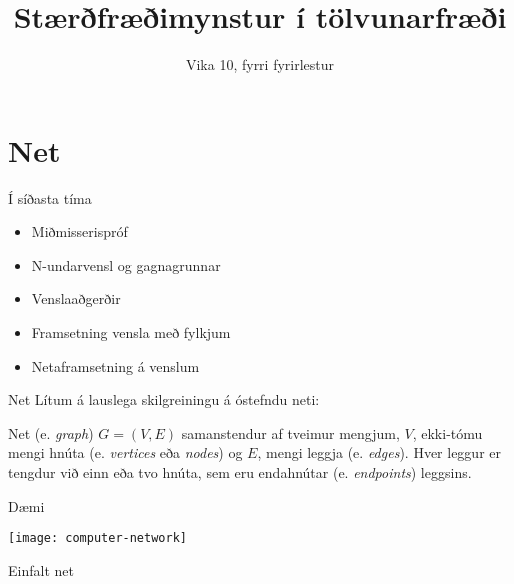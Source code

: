 \documentclass[handout]{beamer}
\title{Stærðfræðimynstur í tölvunarfræði}
\subtitle{Vika 10, fyrri fyrirlestur}
\begin{document}
\begin{frame}
\titlepage
\end{frame}


\section{Net}

\begin{frame}{Í síðasta tíma}
\begin{itemize}
 \item Miðmisserispróf
 \item N-undarvensl og gagnagrunnar
 \item Venslaaðgerðir
 \item Framsetning vensla með fylkjum
 \item Netaframsetning á venslum
\end{itemize}
\end{frame}

\begin{frame}{Net}
Lítum á lauslega skilgreiningu á óstefndu neti:

\begin{tcolorbox}[title=Net]
Net (e. \emph{graph}) $G = (V, E)$ samanstendur af tveimur mengjum, $V$, ekki-tómu mengi hnúta (e. \emph{vertices} eða \emph{nodes}) og $E$, mengi leggja (e. \emph{edges}). Hver leggur er tengdur við einn eða tvo hnúta, sem eru endahnútar (e. \emph{endpoints}) leggsins.
\end{tcolorbox}
\end{frame}

\begin{frame}{Dæmi}
\begin{center}
\texttt{[image: computer-network]}

Einfalt net
\end{center}
\end{frame}
\end{document}

